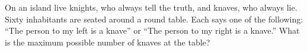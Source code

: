 On an island live knights, who always tell the truth, and knaves, who always lie. Sixty inhabitants are seated around a round table. Each says one of the following: ``The person to my left is a knave'' or ``The person to my right is a knave.'' What is the maximum possible number of knaves at the table?
